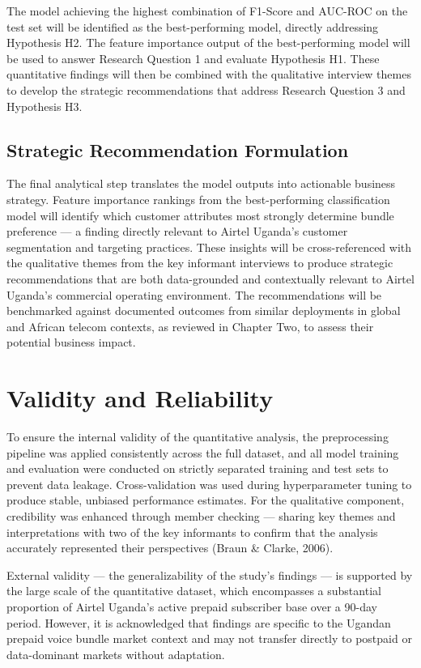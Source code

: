 The model achieving the highest combination of F1-Score and AUC-ROC on the test set will be identified as the best-performing model, directly addressing Hypothesis H2. The feature importance output of the best-performing model will be used to answer Research Question 1 and evaluate Hypothesis H1. These quantitative findings will then be combined with the qualitative interview themes to develop the strategic recommendations that address Research Question 3 and Hypothesis H3.


\subsection{Strategic Recommendation Formulation}

The final analytical step translates the model outputs into actionable business strategy. Feature importance rankings from the best-performing classification model will identify which customer attributes most strongly determine bundle preference --- a finding directly relevant to Airtel Uganda's customer segmentation and targeting practices. These insights will be cross-referenced with the qualitative themes from the key informant interviews to produce strategic recommendations that are both data-grounded and contextually relevant to Airtel Uganda's commercial operating environment. The recommendations will be benchmarked against documented outcomes from similar deployments in global and African telecom contexts, as reviewed in Chapter Two, to assess their potential business impact.


\section{Validity and Reliability}

To ensure the internal validity of the quantitative analysis, the preprocessing pipeline was applied consistently across the full dataset, and all model training and evaluation were conducted on strictly separated training and test sets to prevent data leakage. Cross-validation was used during hyperparameter tuning to produce stable, unbiased performance estimates. For the qualitative component, credibility was enhanced through member checking --- sharing key themes and interpretations with two of the key informants to confirm that the analysis accurately represented their perspectives (Braun \& Clarke, 2006).

External validity --- the generalizability of the study's findings --- is supported by the large scale of the quantitative dataset, which encompasses a substantial proportion of Airtel Uganda's active prepaid subscriber base over a 90-day period. However, it is acknowledged that findings are specific to the Ugandan prepaid voice bundle market context and may not transfer directly to postpaid or data-dominant markets without adaptation.


